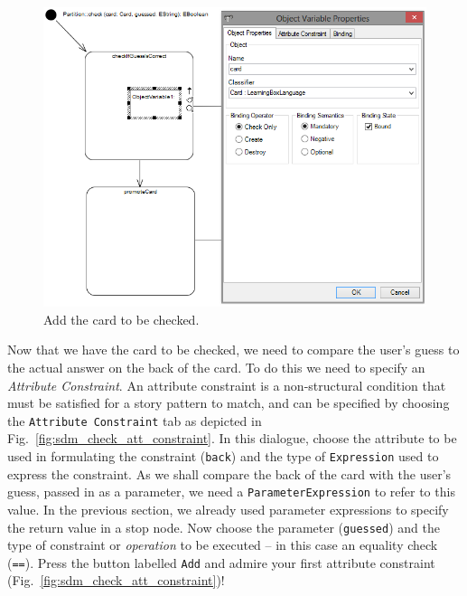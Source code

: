 \begin{figure}[htbp]
\begin{center}
  \includegraphics[width=\textwidth]{pics/sdmBilder/check/sdm17RAW}
  \caption{Add the card to be checked.}
  \label{fig:sdm_check_addCard}
\end{center}
\end{figure}

Now that we have the card to be checked, we need to compare the user's guess to
the actual answer on the back of the card.  To do this we need to specify an
\emph{Attribute Constraint}.  An attribute constraint is a
non-structural condition that must be satisfied for a story pattern to match,
and can be specified by choosing the \texttt{Attribute Constraint} tab as
depicted in Fig.~\ref{fig:sdm_check_att_constraint}.  In this dialogue, choose
the attribute to be used in formulating the constraint (\texttt{back}) and the
type of \texttt{Expression} used to express the constraint.  As we shall compare
the back of the card with the user's guess, passed in as a parameter, we need a
\texttt{ParameterExpression} to refer to this value.  In the previous section,
we already used parameter expressions to specify the return value in a stop
node.  Now choose the parameter (\texttt{guessed}) and the type of
constraint or \emph{operation} to be executed -- in this case an equality check
(\texttt{==}). Press the button labelled \texttt{Add} and admire your first
attribute constraint (Fig.~\ref{fig:sdm_check_att_constraint})!

